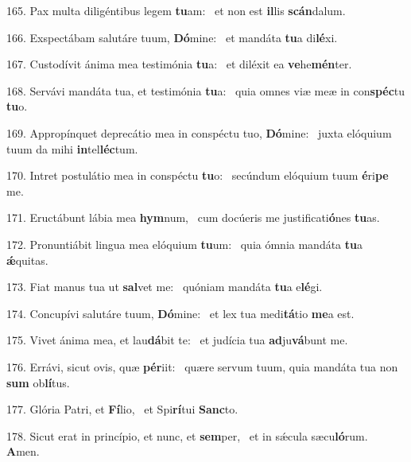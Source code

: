 165. Pax multa diligéntibus legem \textbf{tu}am: \ast\  et non est \textbf{il}lis \textbf{scán}dalum.\

166. Exspectábam salutáre tuum, \textbf{Dó}mine: \ast\  et mandáta \textbf{tu}a di\textbf{lé}xi.\

167. Custodívit ánima mea testimónia \textbf{tu}a: \ast\  et diléxit ea \textbf{ve}he\textbf{mén}ter.\

168. Servávi mandáta tua, et testimónia \textbf{tu}a: \ast\  quia omnes viæ meæ in con\textbf{spéc}tu \textbf{tu}o.\

169. Appropínquet deprecátio mea in conspéctu tuo, \textbf{Dó}mine: \ast\  juxta elóquium tuum da mihi \textbf{in}tel\textbf{léc}tum.\

170. Intret postulátio mea in conspéctu \textbf{tu}o: \ast\  secúndum elóquium tuum \textbf{é}ri\textbf{pe} me.\

171. Eructábunt lábia mea \textbf{hym}num, \ast\  cum docúeris me justificati\textbf{ó}nes \textbf{tu}as.\

172. Pronuntiábit lingua mea elóquium \textbf{tu}um: \ast\  quia ómnia mandáta \textbf{tu}a \textbf{ǽ}quitas.\

173. Fiat manus tua ut \textbf{sal}vet me: \ast\  quóniam mandáta \textbf{tu}a e\textbf{lé}gi.\

174. Concupívi salutáre tuum, \textbf{Dó}mine: \ast\  et lex tua medi\textbf{tá}tio \textbf{me}a est.\

175. Vivet ánima mea, et lau\textbf{dá}bit te: \ast\  et judícia tua \textbf{ad}ju\textbf{vá}bunt me.\

176. Errávi, sicut ovis, quæ \textbf{pér}iit: \ast\  quære servum tuum, quia mandáta tua non \textbf{sum} ob\textbf{lí}tus.\

177. Glória Patri, et \textbf{Fí}lio, \ast\  et Spi\textbf{rí}tui \textbf{Sanc}to.\

178. Sicut erat in princípio, et nunc, et \textbf{sem}per, \ast\  et in sǽcula sæcu\textbf{ló}rum. \textbf{A}men.\

